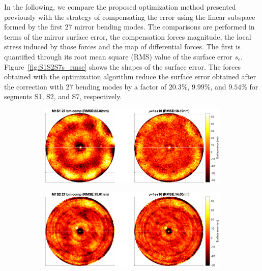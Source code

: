\documentclass{gmto}
\begin{document}
In the following, we compare the proposed optimization method presented previously with the strategy of compensating the error using the linear subspace formed by the first 27 mirror bending modes. The comparisons are performed in terms of the mirror surface error, the compensation forces magnitude, the local stress induced by those forces and the map of differential forces. The first is quantified through its root mean square (RMS) value of the surface error $s_\epsilon$. Figure~\ref{fig:S1S2S7s_rmse} shows the shapes of the surface error. The forces obtained with the optimization algorithm reduce the surface error obtained after the correction with 27 bending modes by a factor of $20.3$\%, $9.99$\%, and $9.54$\% for segments \textsf{S1}, \textsf{S2}, and \textsf{S7}, respectively.
\begin{figure}[p]
\begin{subfigure}[b]{\textwidth}
\centering
\includegraphics[width=\textwidth]{./pictures/s1_surfaceRMSE.eps}
\end{subfigure}
%
\begin{subfigure}[b]{\textwidth}
\centering
\includegraphics[width=\textwidth]{./pictures/s2_surfaceRMSE.eps}
\end{subfigure}
\begin{subfigure}[b]{\textwidth}

\end{subfigure}
\end{figure}
\end{document}
